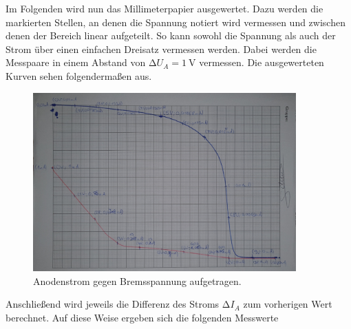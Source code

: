 Im Folgenden wird nun das Millimeterpapier ausgewertet. Dazu werden die markierten Stellen, an denen die Spannung notiert wird vermessen und 
zwischen denen der Bereich linear aufgeteilt. So kann sowohl die Spannung als auch der Strom über einen einfachen Dreisatz vermessen werden.
Dabei werden die Messpaare in einem Abstand von $\increment U_A =\qty{1}{\volt}$ vermessen. Die ausgewerteten Kurven sehen folgendermaßen aus.

\begin{figure}[H]
    \centering
    \includegraphics[width=0.9\textwidth]{content/Bremsspannung.jpg}
    \caption{Anodenstrom gegen Bremsspannung aufgetragen.}
    \label{fig:Bremsspannung}
\end{figure}

\noindent Anschließend wird jeweils die Differenz des Stroms $\increment I_A$ zum vorherigen Wert berechnet.
Auf diese Weise ergeben sich die folgenden Messwerte


